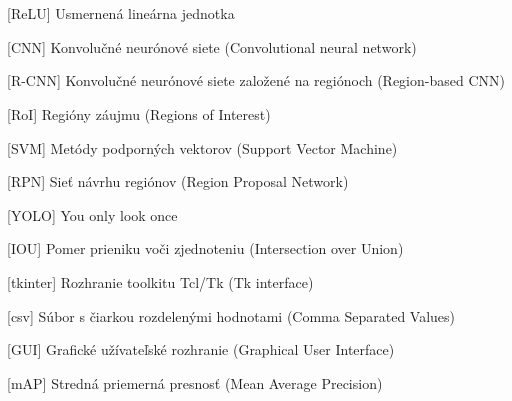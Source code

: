 \cleardoublepage
\chapter*{\listofabbrevname}
{}

\begin{acronym}[KolikMista]

		[ReLU]
		{Usmernená lineárna jednotka}

		[CNN]
		{Konvolučné neurónové siete (Convolutional neural network)}

		[R-CNN]
		{Konvolučné neurónové siete založené na regiónoch (Region-based CNN)}

		[RoI]
		{Regióny záujmu (Regions of Interest)}

		[SVM]
		{Metódy podporných vektorov (Support Vector Machine)}

		[RPN]
		{Sieť návrhu regiónov (Region Proposal Network)}

		[YOLO]
		{You only look once}
	
		[IOU]
		{Pomer prieniku voči zjednoteniu (Intersection over Union)}
	
		[tkinter]
		{Rozhranie toolkitu Tcl/Tk (Tk interface)}

		[csv]
		{Súbor s čiarkou rozdelenými hodnotami (Comma Separated Values)}

		[GUI]
		{Grafické užívateľské rozhranie (Graphical User Interface)}

		[mAP]
		{Stredná priemerná presnosť (Mean Average Precision)}




\end{acronym}
